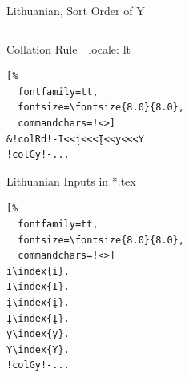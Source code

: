 \documentclass[aspectratio=169,10pt]{beamer}
\begin{document}
\begin{frame}[fragile]{Lithuanian, Sort Order of Y}

\begin{columns}
\begin{column}{60mm}

\setmonofont{Noto Sans Mono}
\begin{block}{Collation Rule~~\scriptsize locale: lt}
\begin{Verbatim}[%
  fontfamily=tt,
  fontsize=\fontsize{8.0}{8.0},
  commandchars=!<>]
&!colRd!-I<<į<<<Į<<y<<<Y
!colGy!-...
\end{Verbatim}
\end{block}
\begin{exampleblock}{Lithuanian Inputs in *.tex}
\begin{Verbatim}[%
  fontfamily=tt,
  fontsize=\fontsize{8.0}{8.0},
  commandchars=!<>]
i\index{i}.
I\index{I}.
į\index{į}.
Į\index{Į}.
y\index{y}.
Y\index{Y}.
!colGy!-...
\end{Verbatim}
\end{exampleblock}
\end{column}

\begin{column}{60mm}
\begin{center}
%
\end{center}
\end{column}
\end{columns}

\end{frame}

\end{document}
